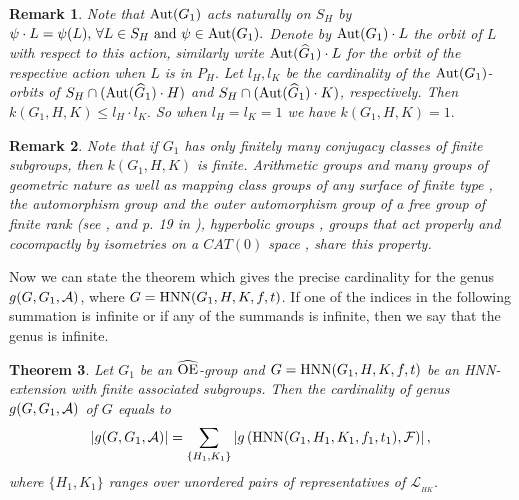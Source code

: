 \documentclass[a4paper,12pt]{article}
\newtheorem{thm}{Theorem}[section]
\newcommand{\A}{{\cal A}}
\newcommand{\Oe}{\rm \widehat{OE}}
\newcommand{\F}{{\cal F}}
\def\aut {{\rm Aut}}
\def\inn {{\rm Inn}}
\def\hnn {{\rm HNN}}
\newtheorem{rem}[thm]{Remark}
\begin{document}
{\begin{rem} \label{os ls}
Note that $\aut(G_1)$ acts naturally on $S_H$ by $\psi \cdot L=\psi(L), \, \forall L \in S_H \mbox{ and } \psi \in \aut( G_1).$ Denote by $\aut(G_1) \cdot L$ the orbit of $L$ with respect to this action, similarly write $\aut(\widehat{G}_1) \cdot L$ for the orbit of the respective action when $L$ is in $P_H.$ Let $l_{H}, l_{K}$ be the cardinality of the $\aut(G_1)$-orbits of $S_H \cap (\aut(\widehat{G}_1) \cdot H)$ and $S_H \cap (\aut(\widehat{G}_1) \cdot K)$, respectively. Then $k(G_1, H, K) \leq l_{H} \cdot l_{K}.$ So when $l_H=l_K=1$ we have  $k(G_1, H, K)=1.$       
\end{rem}

\begin{rem} Note that if $G_1$ has only finitely many conjugacy classes of finite subgroups, then  $k(G_1,H,K)$ is finite. Arithmetic groups   \cite{borelarith} and many groups of geometric nature as well as  mapping class groups of any surface of finite type \cite[Theorem 6]{Brid}, the automorphism group and the outer automorphism group of a free group of finite rank (see \cite{culler}, \cite{zimm} and p. 19 in \cite{vog}),  hyperbolic groups   \cite[Theorem 3.2, p. 459]{bridcurvature},  
groups that act properly and cocompactly by isometries on a $CAT(0)$ space \cite[Corollary 2.8 (2), p. 179]{bridcurvature}, share this property.    
\end{rem}

Now  we can state the  theorem which gives the precise cardinality for the genus $g(G,G_1,\A)$, where $G=\hnn(G_1, H, K, f, t)$. If one of the indices in the following summation is infinite or if any of the summands is infinite, then we say that the genus is infinite.

\begin{thm}\label{genus hnn nao fixos} Let $G_1$ be an $\Oe$-group and $G=\hnn(G_1, H, K, f, t)$ be an HNN-extension with finite associated subgroups. Then the cardinality of genus $g(G,G_1,\A)$ of $G$  equals to $$|g(G,G_1,\A)|=\displaystyle\sum_{\{H_1,K_1\}} \left| g\left(\hnn(G_1, H_1, K_1, f_1, t_1), \F\right)\right|,$$ where $\{H_1,K_1\}$  ranges over unordered pairs of representatives of  $\mathscr{L}_{_{HK}}.$ 

\end{thm}


}
\end{document}
